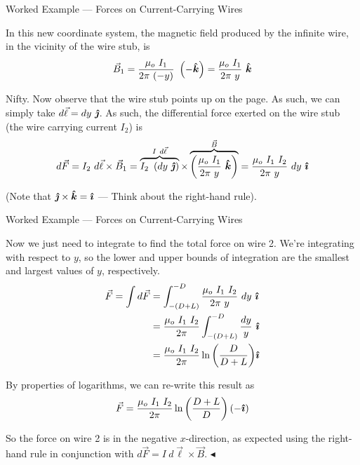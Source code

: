 \documentclass{beamer}
\begin{document}
\begin{frame}{Worked Example --- Forces on Current-Carrying Wires}

In this new coordinate system, the magnetic field produced by the infinite wire, in the vicinity of the wire stub, is
\begin{equation*}
    \vec{B}_1 = \frac{\mu_o\ I_1}{2\pi\ (-y)}\ \left( -\bm{\hat{k}} \right) = \frac{\mu_o\ I_1}{2\pi\ y}\ \bm{\hat{k}}
\end{equation*}

Nifty. Now observe that the wire stub points up on the page. As such, we can simply take $d\vec{\ell} = dy\ \jhat$. As such, the differential force exerted on the wire stub (the wire carrying current $I_2$) is
\begin{align*}
    d\vec{F} = I_2\ d\vec{\ell} \times \vec{B}_1 = \overbrace{I_2\ \left( dy\ \jhat \right)}^{I\ d\vec{\ell}} \times \overbrace{\left( \frac{\mu_o\ I_1}{2\pi\ y}\ \khat \right)}^{\vec{B}} = \frac{\mu_o\ I_1\ I_2}{2\pi\ y}\ dy\ \ihat
\end{align*}

(Note that $\bm{\hat{\jmath}} \times \bm{\hat{k}} = \bm{\hat{\imath}}$ --- Think about the right-hand rule).

\end{frame}

\begin{frame}{Worked Example --- Forces on Current-Carrying Wires}

Now we just need to integrate to find the total force on wire 2. We're integrating with respect to $y$, so the lower and upper bounds of integration are the smallest and largest values of $y$, respectively.
\vspace{-2em}
\begin{align*}
    \vec{F} = \int d\vec{F} &= \int_{-(D+L)}^{-D} \frac{\mu_o\ I_1\ I_2}{2\pi\ y}\ dy\ \ihat \\
                            &= \frac{\mu_o\ I_1\ I_2}{2\pi} \int_{-(D+L)}^{-D} \frac{dy}{y}\ \ihat \\
                            &= \frac{\mu_o\ I_1\ I_2}{2\pi} \ln{\left( \frac{D}{D+L} \right)} \ihat
\end{align*}

By properties of logarithms, we can re-write this result as
\begin{equation*}
    \vec{F} = \frac{\mu_o\ I_1\ I_2}{2\pi} \ln{\left( \frac{D+L}{D} \right)} \left(-\bm{\hat{\imath}}\right)
\end{equation*}

So the force on wire 2 is in the negative $x$-direction, as expected using the right-hand rule in conjunction with $d\vec{F} = I\ d\vec{\ell} \times \vec{B}$. $\blacktriangleleft$

\end{frame}
\end{document}
